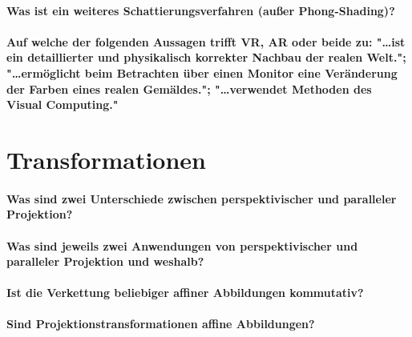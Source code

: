		\paragraph{Was ist ein weiteres Schattierungsverfahren (außer Phong-Shading)?}

		\paragraph{Auf welche der folgenden Aussagen trifft VR, AR oder beide zu: "\dots ist ein detaillierter und physikalisch korrekter Nachbau der realen Welt."; "\dots ermöglicht beim Betrachten über einen Monitor eine Veränderung der Farben eines realen Gemäldes."; "\dots verwendet Methoden des Visual Computing."}

	\section{Transformationen}
		\paragraph{Was sind zwei Unterschiede zwischen perspektivischer und paralleler Projektion?}

		\paragraph{Was sind jeweils zwei Anwendungen von perspektivischer und paralleler Projektion und weshalb?}

		\paragraph{Ist die Verkettung beliebiger affiner Abbildungen kommutativ?}

		\paragraph{Sind Projektionstransformationen affine Abbildungen?}

